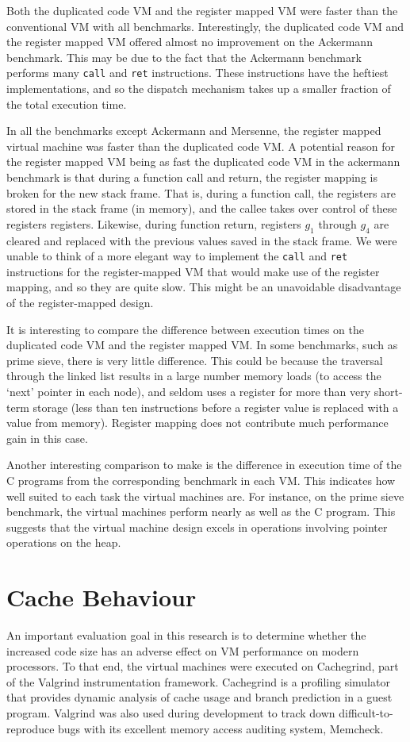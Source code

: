 		Both the duplicated code VM and the register mapped VM were faster than the conventional VM with all benchmarks. Interestingly, the duplicated code VM and the register mapped VM offered almost no improvement on the Ackermann benchmark. This may be due to the fact that the Ackermann benchmark performs many \texttt{call} and \texttt{ret} instructions. These instructions have the heftiest implementations, and so the dispatch mechanism takes up a smaller fraction of the total execution time. 
		
		In all the benchmarks except Ackermann and Mersenne, the register mapped virtual machine was faster than the duplicated code VM. A potential reason for the register mapped VM being as fast the duplicated code VM in the ackermann benchmark is that during a function call and return, the register mapping is broken for the new stack frame. That is, during a function call, the registers are stored in the stack frame (in memory), and the callee takes over control of these registers registers. Likewise, during function return, registers $g_1$ through $g_4$ are cleared and replaced with the previous values saved in the stack frame. We were unable to think of a more elegant way to implement the \texttt{call} and \texttt{ret} instructions for the register-mapped VM that would make use of the register mapping, and so they are quite slow. This might be an unavoidable disadvantage of the register-mapped design.
		
		It is interesting to compare the difference between execution times on the duplicated code VM and the register mapped VM. In some benchmarks, such as prime sieve, there is very little difference. This could be because the traversal through the linked list results in a large number memory loads (to access the `next' pointer in each node), and seldom uses a register for more than very short-term storage (less than ten instructions before a register value is replaced with a value from memory). Register mapping does not contribute much performance gain in this case.
		
		Another interesting comparison to make is the difference in execution time of the C programs from the corresponding benchmark in each VM. This indicates how well suited to each task the virtual machines are. For instance, on the prime sieve benchmark, the virtual machines perform nearly as well as the C program. This suggests that the virtual machine design excels in operations involving pointer operations on the heap.
	
	\section{Cache Behaviour}
		An important evaluation goal in this research is to determine whether the increased code size has an adverse effect on VM performance on modern processors. To that end, the virtual machines were executed on Cachegrind, part of the Valgrind instrumentation framework. Cachegrind is a profiling simulator that provides dynamic analysis of cache usage and branch prediction in a guest program. Valgrind was also used during development to track down difficult-to-reproduce bugs with its excellent memory access auditing system, Memcheck.
		
